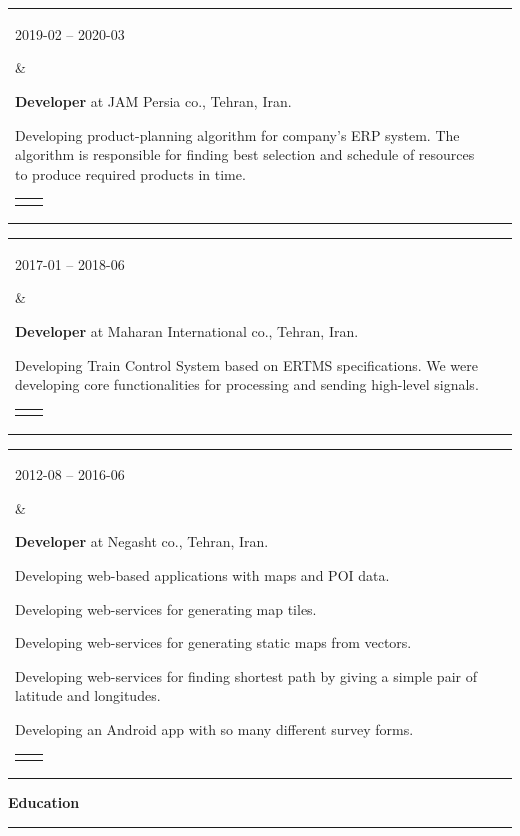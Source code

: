 \documentclass[11pt,a4paper,oneside]{article}
\makeatletter
\newcommand{\prog}{Programming Lang.:}
\newcommand{\os}{Operating System:}
\newcommand{\vcs}{Version Controls:}
\newcommand{\issue}{Issue Tracking:}
\renewcommand{\section}[1]{%
{\large\textbf{#1}}\\
\rule[9pt]{18cm}{.4pt}\vspace{-16pt}%
}
\newenvironment{mytable}{%
\begin{tabular}{@{}l@{\hspace{4mm}}l@{}}%
}{\end{tabular}}
\newcommand{\myitem}[2]{%
\parbox[t]{16mm}{#1}&\parbox[t]{16cm}{#2}\\%
}
\newenvironment{innertable}{%
\begin{tabular}{@{}l@{\hspace{5mm}}l@{}}%
}{\end{tabular}}
\newcommand{\inneritem}[2]{%
\parbox{35mm}{{\color{darkgray}#1}}&\parbox{12cm}{#2}\\%
}
\makeatother
\begin{document}
\begin{mytable}
\myitem{2019-02 -- 2020-03}{%
\textbf{Developer} at
JAM Persia co., Tehran, Iran.

Developing product-planning algorithm for company's ERP system.
The algorithm is responsible for finding best selection and
schedule of resources to produce required products in time.

\begin{innertable}
\inneritem{\prog}{C\#}
\inneritem{\os}{Windows}
\inneritem{\vcs}{SVN}
\inneritem{\issue}{Jira}
\end{innertable}
}
\end{mytable}

\begin{mytable}
\myitem{2017-01 -- 2018-06}{
\textbf{Developer} at
Maharan International co., Tehran, Iran.

Developing Train Control System based on ERTMS specifications.
We were developing core functionalities for processing and
sending high-level signals.

\begin{innertable}
\inneritem{\prog}{C with Frama-C}
\inneritem{\os}{Windows}
\inneritem{\vcs}{TFS}
\inneritem{\issue}{Microsoft Project}
\end{innertable}
}
\end{mytable}

\begin{mytable}
\myitem{2012-08 -- 2016-06}{
\textbf{Developer} at
Negasht co., Tehran, Iran.

Developing web-based applications with maps and POI data.

Developing web-services for generating map tiles.

Developing web-services for generating static maps from vectors.

Developing web-services for finding shortest path by giving a
simple pair of latitude and longitudes.

Developing an Android app with so many different survey forms.

\begin{innertable}
\inneritem{\prog}{C\#, JavaScript, C++, and Java}
\inneritem{\os}{Windows}
\inneritem{\vcs}{Microsoft Visual SourceSafe}
\inneritem{\issue}{Company-specific issue tracker}
\end{innertable}
}
\end{mytable}

\section{Education}
\end{document}
